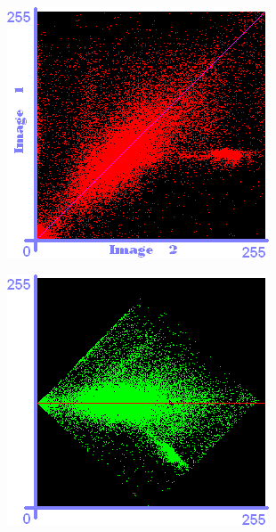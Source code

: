 \begin{figure}[h!]
\centering
\begin{minipage}{0.3\textwidth}
    \centering
    \includegraphics[width=\textwidth]{pca1}\label{fig:cp02_pca1}
\end{minipage}
\begin{minipage}{0.3\textwidth}
    \centering
    \includegraphics[width=\textwidth]{pca2}\label{fig:cp02_pca2}

\end{minipage}
\end{figure}
